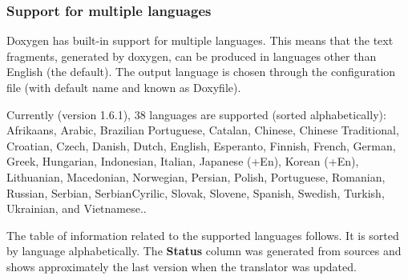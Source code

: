 \subsubsection*{Support for multiple languages}

Doxygen has built-\/in support for multiple languages. This means that the text fragments, generated by doxygen, can be produced in languages other than English (the default). The output language is chosen through the configuration file (with default name and known as Doxyfile).

Currently (version 1.6.1), 38 languages are supported (sorted alphabetically): Afrikaans, Arabic, Brazilian Portuguese, Catalan, Chinese, Chinese Traditional, Croatian, Czech, Danish, Dutch, English, Esperanto, Finnish, French, German, Greek, Hungarian, Indonesian, Italian, Japanese (+En), Korean (+En), Lithuanian, Macedonian, Norwegian, Persian, Polish, Portuguese, Romanian, Russian, Serbian, SerbianCyrilic, Slovak, Slovene, Spanish, Swedish, Turkish, Ukrainian, and Vietnamese..

The table of information related to the supported languages follows. It is sorted by language alphabetically. The {\bfseries Status} column was generated from sources and shows approximately the last version when the translator was updated.



